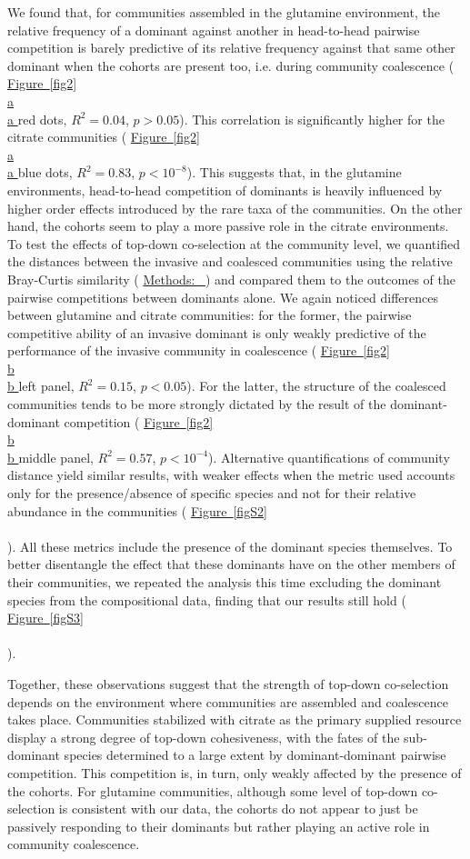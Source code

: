 \documentclass[a4paper,10pt]{article}
\newcommand{\figref}[2][]{%
  \hyperref[{#2}]{%
    Figure~\ref*{#2}%
    \ifx\\#1\\%
    \else
      #1%
    \fi
  }%
}
\newcommand{\methodsref}[1]{%
  \hyperref[{methods:#1}]{%
   Methods:~\nameref*{methods:#1}%
  }%
}
\begin{document}
We found that, for communities assembled in the glutamine environment,
the relative frequency of a dominant against another in head-to-head pairwise competition
is barely predictive of its relative frequency against that same other dominant when the
cohorts are present too, i.e. during community coalescence
(\figref[a]{fig2} red dots, $R^2=0.04$, $p>0.05$).
This correlation is significantly higher for the citrate communities
 (\figref[a]{fig2} blue dots, $R^2=0.83$, $p<10^{-8}$).
This suggests that, in the glutamine environments, head-to-head competition of dominants
is heavily influenced by higher order effects introduced by the rare taxa of the communities.
On the other hand, the cohorts seem to play a more passive role in the citrate environments.
To test the effects of top-down co-selection at the community level,
we quantified the distances between the invasive and coalesced communities
using the relative Bray-Curtis similarity (\methodsref{metrics})
and compared them to the outcomes of the pairwise competitions between dominants alone.
We again noticed differences between glutamine and citrate communities:
for the former,
the pairwise competitive ability of an invasive dominant
is only weakly predictive of the performance of the invasive community in coalescence
(\figref[b]{fig2} left panel, $R^2=0.15$, $p<0.05$).
For the latter,
the structure of the coalesced communities tends to be more strongly dictated by the
result of the dominant-dominant competition
(\figref[b]{fig2} middle panel, $R^2=0.57$, $p<10^{-4}$).
Alternative quantifications of community distance yield similar results,
with weaker effects when the metric used
accounts only for the presence/absence of specific species and not for their relative abundance in
the communities
(\figref{figS2}).
All these metrics include the presence of the dominant species themselves. To better disentangle the effect
that these dominants have on the other members of their communities, we repeated the analysis this time
excluding the dominant species from the compositional data, finding that our results still hold
(\figref{figS3}).

Together, these observations suggest that the strength of top-down co-selection depends on
the environment where communities are assembled and coalescence takes place.
Communities stabilized with citrate as the primary supplied resource
display a strong degree of top-down cohesiveness,
with the fates of the sub-dominant species determined to a large extent by dominant-dominant
pairwise competition. This competition is, in turn, only weakly affected by the presence of the cohorts.
For glutamine communities, although some level of top-down co-selection is consistent with our data,
the cohorts do not appear to just be passively responding to their dominants
but rather playing an active role in community coalescence.
\end{document}
